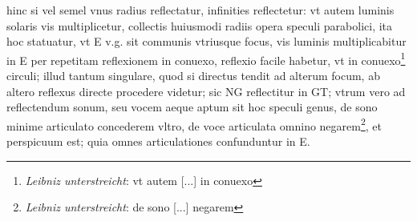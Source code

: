 \pend \pstart [p.~102] [...] hinc si  vel semel vnus radius reflectatur, infinities reflectetur:  vt autem luminis solaris\protect{} vis multiplicetur, collectis huiusmodi radiis opera speculi parabolici\protect{}, ita hoc statuatur,  vt E v.g. sit communis vtriusque focus\protect{}, vis luminis  multiplicabitur in E per repetitam reflexionem\protect{} in conuexo, reflexio\protect{} facile habetur, vt in conuexo\footnote{\textit{Leibniz unterstreicht}: vt autem [...] in conuexo} circuli; illud tantum singulare, quod si directus tendit ad alterum focum\protect{}, ab altero reflexus directe procedere videtur; sic  NG reflectitur in GT; vtrum vero ad reflectendum sonum\protect{}, seu vocem aeque aptum sit hoc speculi\protect{} genus,  de sono\protect{} minime articulato concederem vltro, de voce  articulata omnino negarem\footnote{\textit{Leibniz unterstreicht}: de sono [...] negarem}, et perspicuum est; quia  omnes articulationes confunduntur in E.